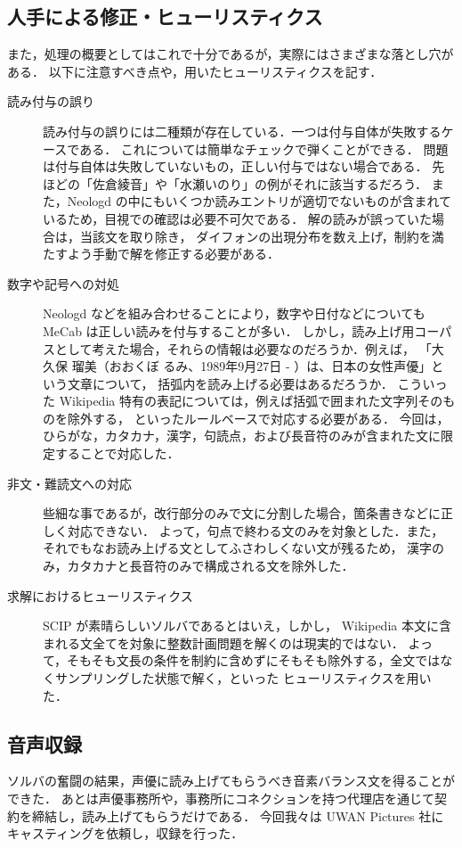 \documentclass[final,10pt,twocolumn,3p,times,fleqn]{elsarticle}
\begin{document}
  \subsection{人手による修正・ヒューリスティクス}
  また，処理の概要としてはこれで十分であるが，実際にはさまざまな落とし穴がある．
  以下に注意すべき点や，用いたヒューリスティクスを記す．
  \begin{description}
   \item[読み付与の誤り] 読み付与の誤りには二種類が存在している．一つは付与自体が失敗するケースである．
	      これについては簡単なチェックで弾くことができる．
	      問題は付与自体は失敗していないもの，正しい付与ではない場合である．
	      先ほどの「佐倉綾音」や「水瀬いのり」の例がそれに該当するだろう．
	      また，Neologd の中にもいくつか読みエントリが適切でないものが含まれているため，目視での確認は必要不可欠である．
	      解の読みが誤っていた場合は，当該文を取り除き，
	      ダイフォンの出現分布を数え上げ，制約を満たすよう手動で解を修正する必要がある．
   \item[数字や記号への対処] Neologd などを組み合わせることにより，数字や日付などについても MeCab は正しい読みを付与することが多い．
	      しかし，読み上げ用コーパスとして考えた場合，それらの情報は必要なのだろうか．例えば，
	      「大久保 瑠美（おおくぼ るみ、1989年9月27日 - ）は、日本の女性声優」という文章について，
	      括弧内を読み上げる必要はあるだろうか．
	      こういった Wikipedia 特有の表記については，例えば括弧で囲まれた文字列そのものを除外する，
	      といったルールベースで対応する必要がある．
	      今回は，ひらがな，カタカナ，漢字，句読点，および長音符のみが含まれた文に限定することで対応した．
   \item[非文・難読文への対応] 些細な事であるが，改行部分のみで文に分割した場合，箇条書きなどに正しく対応できない．
	      よって，句点で終わる文のみを対象とした．また，それでもなお読み上げる文としてふさわしくない文が残るため，
	      漢字のみ，カタカナと長音符のみで構成される文を除外した．
   \item[求解におけるヒューリスティクス]  SCIP が素晴らしいソルバであるとはいえ，しかし，
	      Wikipedia 本文に含まれる文全てを対象に整数計画問題を解くのは現実的ではない．
	      よって，そもそも文長の条件を制約に含めずにそもそも除外する，全文ではなくサンプリングした状態で解く，といった
	      ヒューリスティクスを用いた．
  \end{description}

  \subsection{音声収録}
  ソルバの奮闘の結果，声優に読み上げてもらうべき音素バランス文を得ることができた．
  あとは声優事務所や，事務所にコネクションを持つ代理店を通じて契約を締結し，読み上げてもらうだけである．
  今回我々は UWAN Pictures 社にキャスティングを依頼し，収録を行った．
\end{document}
